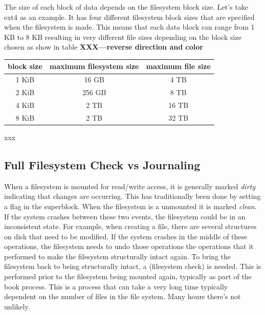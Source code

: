 \noindent
The size of each block of data depends on the filesystem block size. Let's take ext4 as an example. It has four different filesystem block sizes that are specified when the filesystem is made. This means that each data block can range from 1 KB to 8 KB resulting in very different file sizes depending on the block size chosen as show in table \textbf{XXX---reverse direction and color}

\begin{table}
\centering
\begin{tabular}{|c|c|c|}
\hline
block size&maximum filesystem size&maximum file size\\
\hline
1 KiB&16 GB&4 TB\\
2 KiB&256 GB&8 TB\\
4 KiB&2 TB&16 TB\\
8 KiB&2 TB&32 TB\\
\hline
\end{tabular}
\end{table}

\noindent
xxx


\subsection{Full Filesystem Check vs Journaling}

When a filesystem is mounted for read/write access, it is generally marked \textit{dirty} indicating that changes are occurring. This has traditionally been done by setting a flag in the superblock. When the filesystem is a unmounted it is marked \textit{clean}. If the system crashes between these two events, the filesystem could be in an inconsistent state. For example, when creating a file, there are several structures on disk that need to be modified. If the system crashes in the middle of these operations, the filesystem needs to undo those operations the operations that it performed to make the filesystem structurally intact again. To bring the filesystem back to being structurally intact, a  (filesystem check) is needed. This is performed prior to the filesystem being mounted again, typically as part of the book process. This is a process that can take a very long time typically dependent on the number of files in the file system. Many hours there's not unlikely.

